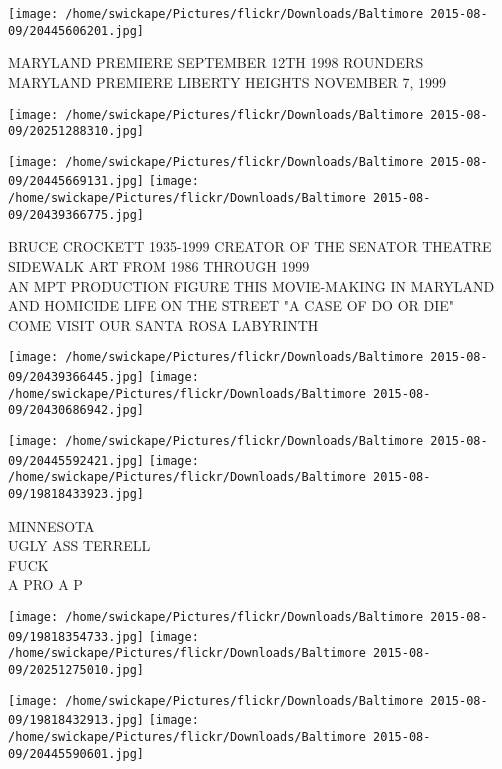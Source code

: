 \documentclass[10pt,letterpaper]{article}
\begin{document}
\vspace{0.25in}
\texttt{[image: /home/swickape/Pictures/flickr/Downloads/Baltimore 2015-08-09/20445606201.jpg]}

MARYLAND PREMIERE SEPTEMBER 12TH 1998 ROUNDERS\\
MARYLAND PREMIERE LIBERTY HEIGHTS NOVEMBER 7, 1999\\
\pagebreak

\texttt{[image: /home/swickape/Pictures/flickr/Downloads/Baltimore 2015-08-09/20251288310.jpg]}

\vspace{0.25in}
\texttt{[image: /home/swickape/Pictures/flickr/Downloads/Baltimore 2015-08-09/20445669131.jpg]}
\texttt{[image: /home/swickape/Pictures/flickr/Downloads/Baltimore 2015-08-09/20439366775.jpg]}

BRUCE CROCKETT 1935{-}1999 CREATOR OF THE SENATOR THEATRE SIDEWALK ART FROM 1986 THROUGH 1999\\
AN MPT PRODUCTION FIGURE THIS MOVIE{-}MAKING IN MARYLAND AND HOMICIDE LIFE ON THE STREET "A CASE OF DO OR DIE"\\
COME VISIT OUR SANTA ROSA LABYRINTH\\
\pagebreak

\texttt{[image: /home/swickape/Pictures/flickr/Downloads/Baltimore 2015-08-09/20439366445.jpg]}
\texttt{[image: /home/swickape/Pictures/flickr/Downloads/Baltimore 2015-08-09/20430686942.jpg]}

\texttt{[image: /home/swickape/Pictures/flickr/Downloads/Baltimore 2015-08-09/20445592421.jpg]}
\texttt{[image: /home/swickape/Pictures/flickr/Downloads/Baltimore 2015-08-09/19818433923.jpg]}

MINNESOTA\\
UGLY ASS TERRELL\\
FUCK\\
A PRO A P\\
\pagebreak

\texttt{[image: /home/swickape/Pictures/flickr/Downloads/Baltimore 2015-08-09/19818354733.jpg]}
\texttt{[image: /home/swickape/Pictures/flickr/Downloads/Baltimore 2015-08-09/20251275010.jpg]}

\texttt{[image: /home/swickape/Pictures/flickr/Downloads/Baltimore 2015-08-09/19818432913.jpg]}
\texttt{[image: /home/swickape/Pictures/flickr/Downloads/Baltimore 2015-08-09/20445590601.jpg]}
\end{document}
